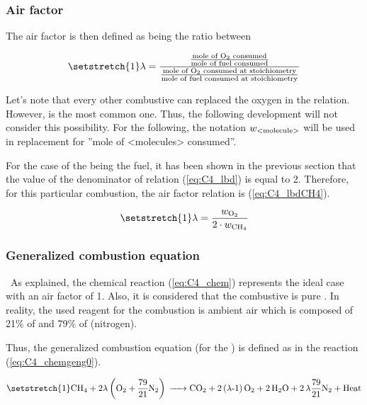 \subsubsection{Air factor}
The air factor is then defined as being the ratio between

\begin{equation}
    \setstretch{1}
    \lambda = \frac{\frac{\text{mole of \ce{O2} consumed}}{\text{mole of fuel consumed}}}{\frac{\text{mole of \ce{O2} consumed at stoichiometry}}{\text{mole of fuel consumed at stoichiometry}}} \label{eq:C4_lbd}
\end{equation}

Let's note that every other combustive can replaced the oxygen in the relation. However,  is the most common one. Thus, the following development will not consider this possibility.
For the following, the notation \(w_{\ce{\text{<molecule>}}}\) will be used in replacement for ''mole of <molecules> consumed''.

For the case of the  being the fuel, it has been shown in the previous section that the value of the denominator of relation (\ref{eq:C4_lbd}) is equal to 2. Therefore, for this particular combustion, the air factor relation is (\ref{eq:C4_lbdCH4}).


\begin{equation}
    \setstretch{1}
    \lambda = \frac{w_{\ce{O2}}}{2\cdot w_{\ce{CH4}}}\label{eq:C4_lbdCH4}
\end{equation}

\subsubsection{Generalized combustion equation}
\quad\ As explained, the chemical reaction (\ref{eq:C4_chem}) represents the ideal case with an air factor of 1. Also, it is considered that the combustive is pure . In reality, the used reagent for the combustion is ambient air which is composed of 21\% of  and 79\% of  (nitrogen).

Thus, the generalized combustion equation (for the ) is defined as in the reaction (\ref{eq:C4_chemgeng0}).

\begin{equation}
    \setstretch{1}
    \ce{CH4 +}2\lambda \left(\ce{O2}+\frac{79}{21}\ce{N2}\right) \ce{-> CO2 + 2(\lambda-1)O2 + 2H2O + 2\lambda\frac{79}{21}N2 + \text{Heat}}\label{eq:C4_chemgeng0}
\end{equation}

